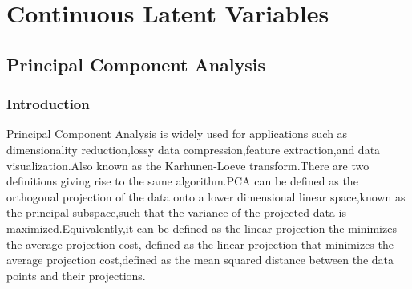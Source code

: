  \chapter{Continuous Latent Variables}
 \section{Principal Component Analysis}
 \subsection{Introduction}
 Principal Component Analysis is widely used for applications such as dimensionality reduction,lossy data compression,feature extraction,and data visualization.Also known as the Karhunen-Loeve transform.There are two definitions giving rise to the same algorithm.PCA can be defined as the orthogonal projection of the data onto a lower dimensional linear space,known as the principal subspace,such that the variance of the projected data  is maximized.Equivalently,it can be defined as the linear projection the minimizes the average projection cost,
defined as  the linear projection that minimizes the average projection cost,defined as the mean squared distance between the data points and their projections.
